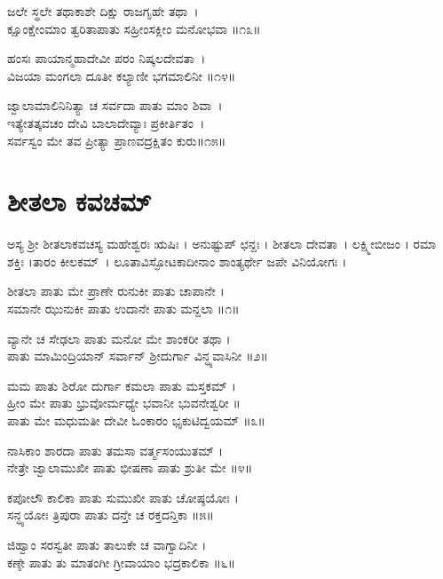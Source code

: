 ಜಲೇ ಸ್ಥಲೇ ತಥಾಕಾಶೇ ದಿಕ್ಷು ರಾಜಗೃಹೇ ತಥಾ~।\\
ಕ್ಷೂಂಕ್ಷೇಂಮಾಂ ತ್ವರಿತಾಪಾತು ಸಹ್ರೀಂಸಕ್ಲೀಂ ಮನೋಭವಾ ॥೧೩॥

ಹಂಸಃ ಪಾಯಾನ್ಮಹಾದೇವೀ ಪರಂ ನಿಷ್ಕಲದೇವತಾ~।\\
ವಿಜಯಾ ಮಂಗಲಾ ದೂತೀ ಕಲ್ಯಾಣೀ ಭಗಮಾಲಿನೀ ॥೧೪॥

ಜ್ವಾಲಾಮಾಲಿನಿನಿತ್ಯಾ ಚ ಸರ್ವದಾ ಪಾತು ಮಾಂ ಶಿವಾ~।\\
ಇತ್ಯೇತತ್ಕವಚಂ ದೇವಿ ಬಾಲಾದೇವ್ಯಾಃ ಪ್ರಕೀರ್ತಿತಂ~।\\
ಸರ್ವಸ್ವಂ ಮೇ ತವ ಪ್ರೀತ್ಯಾ ಪ್ರಾಣವದ್ರಕ್ಷಿತಂ ಕುರು॥೧೫॥


\section{ಶೀತಲಾ ಕವಚಮ್}
ಅಸ್ಯ ಶ್ರೀ ಶೀತಲಾಕವಚಸ್ಯ ಮಹೇಶ್ವರಃ ಋಷಿಃ । ಅನುಷ್ಟುಪ್ ಛನ್ದಃ ।
ಶೀತಲಾ ದೇವತಾ~। ಲಕ್ಷ್ಮೀಬೀಜಂ । ರಮಾ ಶಕ್ತಿಃ ।ತಾರಂ ಕೀಲಕಮ್~।
ಲೂತಾವಿಸ್ಫೋಟಕಾದೀನಾಂ ಶಾಂತ್ಯರ್ಥೇ ಜಪೇ ವಿನಿಯೋಗಃ ।


ಶೀತಲಾ ಪಾತು ಮೇ ಪ್ರಾಣೇ ರುನುಕೀ ಪಾತು ಚಾಪಾನೇ ।\\
ಸಮಾನೇ ಝುನುಕೀ ಪಾತು ಉದಾನೇ ಪಾತು ಮನ್ದಲಾ ॥೧॥

ವ್ಯಾನೇ ಚ ಸೇಢಲಾ ಪಾತು ಮನೋ ಮೇ ಶಾಂಕರೀ ತಥಾ ।\\
ಪಾತು ಮಾಮಿಂದ್ರಿಯಾನ್ ಸರ್ವಾನ್ ಶ್ರೀದುರ್ಗಾ ವಿನ್ಧ್ಯವಾಸಿನೀ ॥೨॥

ಮಮ ಪಾತು ಶಿರೋ ದುರ್ಗಾ ಕಮಲಾ ಪಾತು ಮಸ್ತಕಮ್ ।\\
ಹ್ರೀಂ ಮೇ ಪಾತು ಭ್ರುವೋರ್ಮಧ್ಯೇ ಭವಾನೀ ಭುವನೇಶ್ವರೀ ॥\\
ಪಾತು ಮೇ ಮಧುಮತೀ ದೇವೀ ಓಂಕಾರಂ ಭೃಕುಟಿದ್ವಯಮ್ ॥೩॥

ನಾಸಿಕಾಂ ಶಾರದಾ ಪಾತು ತಮಸಾ ವರ್ತ್ಮಸಂಯುತಮ್ ।\\
ನೇತ್ರೇ ಜ್ವಾಲಾಮುಖೀ ಪಾತು ಭೀಷಣಾ ಪಾತು ಶ್ರುತೀ ಮೇ ॥೪॥

ಕಪೋಲೌ ಕಾಲಿಕಾ ಪಾತು ಸುಮುಖೀ ಪಾತು ಚೋಷ್ಠಯೋಃ ।\\
ಸನ್ಧ್ಯಯೋಃ ತ್ರಿಪುರಾ ಪಾತು ದನ್ತೇ ಚ ರಕ್ತದನ್ತಿಕಾ ॥೫॥

ಜಿಹ್ವಾಂ ಸರಸ್ವತೀ ಪಾತು ತಾಲುಕೇ ಚ ವಾಗ್ವಾದಿನೀ ।\\
ಕಣ್ಠೇ ಪಾತು ತು ಮಾತಂಗೀ ಗ್ರೀವಾಯಾಂ ಭದ್ರಕಾಲಿಕಾ ॥೬॥

